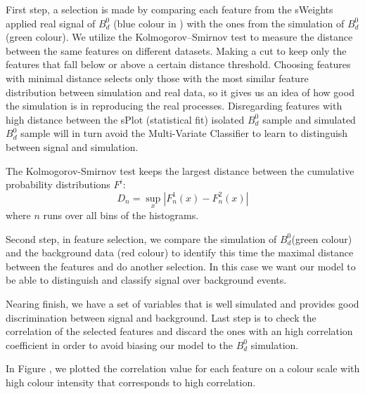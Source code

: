 First step, a selection is made by comparing each feature from the sWeights applied real signal of $B_{d}^{0}$ (blue colour in ) with the ones from the simulation of $B_{d}^{0}$ (green colour). We utilize the Kolmogorov–Smirnov test to measure the distance between the same features on different datasets. Making a cut to keep only the features that fall below or above a certain distance threshold. Choosing features with minimal distance selects only those with the most similar feature distribution between simulation and real data, so it gives us an idea of how good the simulation is in reproducing the real processes. Disregarding features with high distance between the sPlot (statistical fit) isolated $B_d^0$ sample and simulated $B_d^0$ sample will in turn avoid the Multi-Variate Classifier to learn to distinguish between signal and simulation.

The Kolmogorov-Smirnov test \cite{KS_test} keeps the largest distance between the cumulative probability distributions $F^i$:
\begin{equation}
    D_n = \sup_x\left|F_n^1(x)-F_n^2(x)\right|
\end{equation}
where $n$  runs over all bins of the histograms.

Second step, in feature selection, we compare the simulation of $B_{d}^{0}$(green colour) and the background data (red colour) to identify this time the maximal distance between the features and do another selection. In this case we want our model to be able to distinguish and classify signal over background events.

Nearing finish, we have a set of variables that is well simulated and provides good discrimination between signal and background. Last step is to check the correlation of the selected features and discard the ones with an high correlation coefficient in order to avoid biasing our model to the $B_d^0$ simulation.

In Figure , we plotted the correlation value for each feature on a colour scale with high colour intensity that corresponds to high correlation.

